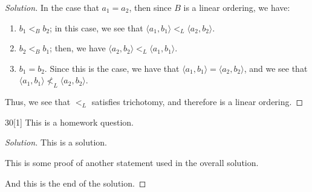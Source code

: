\documentclass{article}
\newenvironment{solution}{\begin{proof}[Solution]}{\end{proof}}
\renewcommand\qedsymbol{$\blacksquare$}
\newenvironment{innerproof}{\renewcommand{\qedsymbol}{$\square$}\proof}{\endproof}
\newcommand{\ang}[1]{\langle {#1} \rangle}
\begin{document}
\begin{solution}
		In the case that $a_{1} = a_{2}$, then since $B$ is a linear ordering, we have:
		\begin{enumerate}
			\item $b_{1} <_{B} b_{2}$; in this case, we see that $\ang{a_{1}, b_{1}} <_{L} \ang{a_{2}, b_{2}}$.
			\item $b_{2} <_{B} b_{1}$; then, we have $\ang{a_{2}, b_{2}} <_{L} \ang{a_{1}, b_{1}}$.
			\item $b_{1} = b_{2}$. Since this is the case, we have that $\ang{a_{1}, b_{1}} = \ang{a_{2}, b_{2}}$, and we see that $\ang{a_{1}, b_{1}} \not<_{L} \ang{a_{2}, b_{2}}$.
		\end{enumerate}
	
		Thus, we see that $<_{L}$ satisfies trichotomy, and therefore is a linear ordering.
	\end{solution}

	\begin{hw}{30}[1]
		This is a homework question.
	\end{hw}
	\begin{solution}
		This is a solution.
		
		\begin{innerproof}
			This is some proof of another statement used in the overall solution.
		\end{innerproof}
	
		And this is the end of the solution.
	\end{solution}
\end{document}
